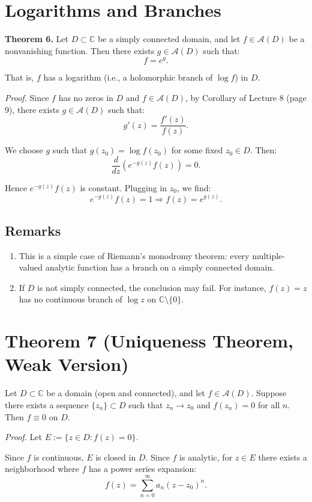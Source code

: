 \documentclass[12pt]{article}
\theoremstyle{definition} %
\theoremstyle{plain} %
\begin{document}
\section*{Logarithms and Branches}

\textbf{Theorem 6.} Let $D \subset \mathbb{C}$ be a simply connected domain, and let $f \in \mathcal{A}(D)$ be a nonvanishing function. Then there exists $g \in \mathcal{A}(D)$ such that:
\[
f = e^g.
\]

That is, $f$ has a logarithm (i.e., a holomorphic branch of $\log f$) in $D$.

\textit{Proof.} Since $f$ has no zeros in $D$ and $f \in \mathcal{A}(D)$, by Corollary of Lecture 8 (page 9), there exists $g \in \mathcal{A}(D)$ such that:
\[
g'(z) = \frac{f'(z)}{f(z)}.
\]

We choose $g$ such that $g(z_0) = \log f(z_0)$ for some fixed $z_0 \in D$. Then:
\[
\frac{d}{dz}(e^{-g(z)} f(z)) = 0.
\]

Hence $e^{-g(z)} f(z)$ is constant. Plugging in $z_0$, we find:
\[
e^{-g(z)} f(z) = 1 \Rightarrow f(z) = e^{g(z)}.
\]

\subsection*{Remarks}

\begin{enumerate}
    \item This is a simple case of Riemann's monodromy theorem: every multiple-valued analytic function has a branch on a simply connected domain.
    \item If $D$ is not simply connected, the conclusion may fail. For instance, $f(z) = z$ has no continuous branch of $\log z$ on $\mathbb{C} \setminus \{0\}$.
\end{enumerate}

\section*{Theorem 7 (Uniqueness Theorem, Weak Version)}

Let $D \subset \mathbb{C}$ be a domain (open and connected), and let $f \in \mathcal{A}(D)$. Suppose there exists a sequence $\{z_n\} \subset D$ such that $z_n \to z_0$ and $f(z_n) = 0$ for all $n$. Then $f \equiv 0$ on $D$.

\textit{Proof.} Let $E := \{ z \in D : f(z) = 0 \}$.

Since $f$ is continuous, $E$ is closed in $D$. Since $f$ is analytic, for $z \in E$ there exists a neighborhood where $f$ has a power series expansion:
\[
f(z) = \sum_{n=0}^\infty a_n (z - z_0)^n.
\]
\end{document}
